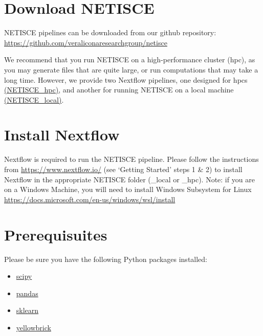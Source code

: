 \documentclass[
]{book}
\providecommand{\tightlist}{%
  \setlength{\itemsep}{0pt}\setlength{\parskip}{0pt}}
\begin{document}
\hypertarget{download-netisce}{%
\section{Download NETISCE}\label{download-netisce}}

NETISCE pipelines can be downloaded from our github repository: \url{https://github.com/veraliconaresearchgroup/netisce}

We recommend that you run NETISCE on a high-performance cluster (hpc), as you may generate files that are quite large, or run computations that may take a long time. However, we provide two Nextflow pipelines, one designed for hpcs \href{https://github.com/VeraLiconaResearchGroup/Netisce/tree/main/NETISCE_hpc}{(NETISCE\_hpc)}, and another for running NETISCE on a local machine \href{https://github.com/VeraLiconaResearchGroup/Netisce/tree/main/NETISCE_local}{(NETISCE\_local)}.

\hypertarget{install-nextflow}{%
\section{Install Nextflow}\label{install-nextflow}}

Nextflow is required to run the NETISCE pipeline. Please follow the instructions from \url{https://www.nextflow.io/} (see `Getting Started' steps 1 \& 2) to install Nextflow in the appropriate NETISCE folder (\_local or \_hpc). Note: if you are on a Windows Machine, you will need to install Windows Subsystem for Linux \url{https://docs.microsoft.com/en-us/windows/wsl/install}

\hypertarget{prerequisuites}{%
\section{Prerequisuites}\label{prerequisuites}}

Please be sure you have the following Python packages installed:

\begin{itemize}
\tightlist
\item
  \href{https://scipy.org/install/}{scipy}
\item
  \href{https://pandas.pydata.org/getting_started.html}{pandas}
\item
  \href{https://scikit-learn.org/stable/install.html}{sklearn}
\item
  \href{https://www.scikit-yb.org/en/latest/quickstart.html}{yellowbrick}
\end{itemize}
\end{document}
